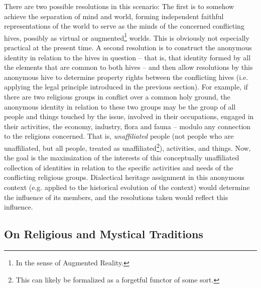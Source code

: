 \documentclass[pra,twocolumn,groupedaddress,10pt]{revtex4}
\theoremstyle{definition}
\begin{document}
There are two possible resolutions in this scenario: The first is to somehow achieve the separation of mind and world, forming independent faithful representations of the world to serve as the minds of the concerned conflicting hives, possibly as virtual or augmented\footnote{In the sense of Augmented Reality.} worlds. This is obviously not especially practical at the present time. A second resolution is to construct the anonymous identity in relation to the hives in question -- that is, that identity formed by all the elements that are common to both hives -- and then allow resolutions by this anonymous hive to determine property rights between the conflicting hives (i.e. applying the legal principle introduced in the previous section). For example, if there are two religious groups in conflict over a common holy ground, the anonymous identity in relation to these two groups may be the group of all people and things touched by the issue, involved in their occupations, engaged in their activities, the economy, industry, flora and fauna -- modulo any connection to the religions concerned. That is, \textit{unaffiliated} people (not people who are unaffiliated, but all people, treated as unaffiliated\footnote{This can likely be formalized as a forgetful functor of some sort.}), activities, and things. Now, the goal is the maximization of the interests of this conceptually unaffiliated collection of identities in relation to the specific activities and needs of the conflicting religious groups. Dialectical heritage assignment in this anonymous context (e.g. applied to the historical evolution of the context) would determine the influence of its members, and the resolutions taken would reflect this influence.


\subsection{On Religious and Mystical Traditions} \label{sec:phirelhistra}
\end{document}
